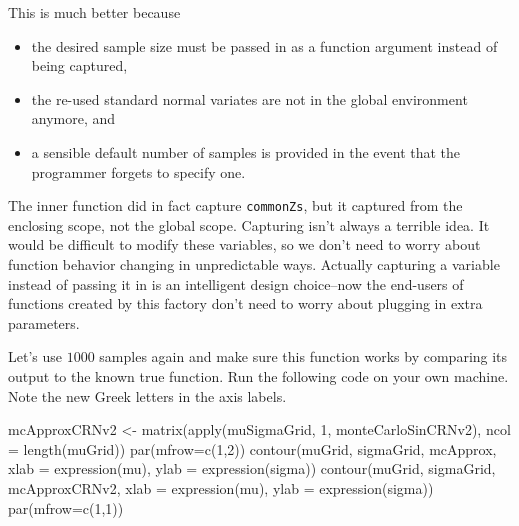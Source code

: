 \documentclass[
  12pt,
  krantz2]{krantz}
\makeatletter
\newenvironment{Shaded}{\begin{snugshade}}{\end{snugshade}}
\newcommand{\AttributeTok}[1]{\textcolor[rgb]{0.61,0.61,0.61}{#1}}
\newcommand{\DecValTok}[1]{\textcolor[rgb]{0.06,0.06,0.06}{#1}}
\newcommand{\FunctionTok}[1]{\textcolor[rgb]{0,0,0}{#1}}
\newcommand{\NormalTok}[1]{#1}
\newcommand{\OtherTok}[1]{\textcolor[rgb]{0.37,0.37,0.37}{#1}}
\providecommand{\tightlist}{%
  \setlength{\itemsep}{0pt}\setlength{\parskip}{0pt}}
\newenvironment{kframe}{%
\medskip{}
\setlength{\fboxsep}{.8em}
 \def\at@end@of@kframe{}%
 \ifinner\ifhmode%
  \def\at@end@of@kframe{\end{minipage}}%
  \begin{minipage}{\columnwidth}%
 \fi\fi%
 \def\FrameCommand##1{\hskip\@totalleftmargin \hskip-\fboxsep
 \colorbox{shadecolor}{##1}\hskip-\fboxsep
     \hskip-\linewidth \hskip-\@totalleftmargin \hskip\columnwidth}%
 \MakeFramed {\advance\hsize-\width
   \@totalleftmargin\z@ \linewidth\hsize
   \@setminipage}}%
 {\par\unskip\endMakeFramed%
 \at@end@of@kframe}
\renewenvironment{Shaded}{\begin{kframe}}{\end{kframe}}
\makeatother
\begin{document}
This is much better because

\begin{itemize}
\tightlist
\item
  the desired sample size must be passed in as a function argument instead of being captured,
\item
  the re-used standard normal variates are not in the global environment anymore, and
\item
  a sensible default number of samples is provided in the event that the programmer forgets to specify one.
\end{itemize}

The inner function did in fact capture \texttt{commonZs}, but it captured from the enclosing scope, not the global scope. Capturing isn't always a terrible idea. It would be difficult to modify these variables, so we don't need to worry about function behavior changing in unpredictable ways. Actually capturing a variable instead of passing it in is an intelligent design choice--now the end-users of functions created by this factory don't need to worry about plugging in extra parameters.

Let's use \(1000\) samples again and make sure this function works by comparing its output to the known true function. Run the following code on your own machine. Note the new Greek letters in the axis labels.

\begin{Shaded}
\begin{Highlighting}[]
\NormalTok{mcApproxCRNv2 }\OtherTok{\textless{}{-}} \FunctionTok{matrix}\NormalTok{(}\FunctionTok{apply}\NormalTok{(muSigmaGrid, }\DecValTok{1}\NormalTok{, monteCarloSinCRNv2), }
                        \AttributeTok{ncol =} \FunctionTok{length}\NormalTok{(muGrid))}
\FunctionTok{par}\NormalTok{(}\AttributeTok{mfrow=}\FunctionTok{c}\NormalTok{(}\DecValTok{1}\NormalTok{,}\DecValTok{2}\NormalTok{))}
\FunctionTok{contour}\NormalTok{(muGrid, sigmaGrid, mcApprox, }
        \AttributeTok{xlab =} \FunctionTok{expression}\NormalTok{(mu), }\AttributeTok{ylab =} \FunctionTok{expression}\NormalTok{(sigma))}
\FunctionTok{contour}\NormalTok{(muGrid, sigmaGrid, mcApproxCRNv2, }
        \AttributeTok{xlab =} \FunctionTok{expression}\NormalTok{(mu), }\AttributeTok{ylab =} \FunctionTok{expression}\NormalTok{(sigma))}
\FunctionTok{par}\NormalTok{(}\AttributeTok{mfrow=}\FunctionTok{c}\NormalTok{(}\DecValTok{1}\NormalTok{,}\DecValTok{1}\NormalTok{))}
\end{Highlighting}
\end{Shaded}
\end{document}
